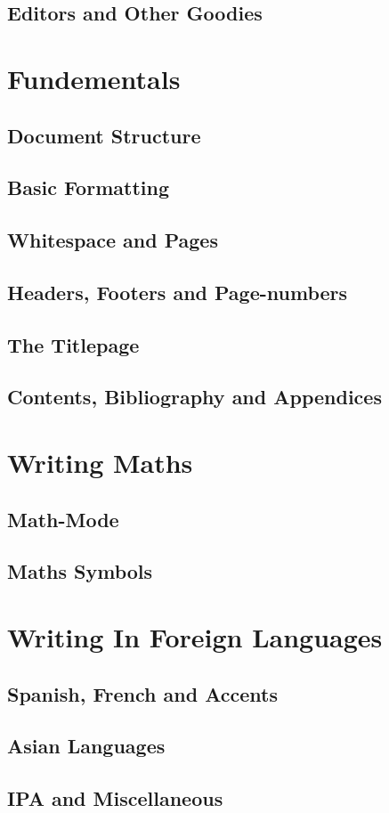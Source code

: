 \documentclass[12pt,a4paper]{article}
\begin{document}
\subsection{Editors and Other Goodies}

\newpage
\section{Fundementals}

\subsection{Document Structure}

\subsection{Basic Formatting}

\subsection{Whitespace and Pages}

\subsection{Headers, Footers and Page-numbers}

\subsection{The Titlepage}

\subsection{Contents, Bibliography and Appendices}

\newpage
\section{Writing Maths}

\subsection{Math-Mode}

\subsection{Maths Symbols}

\newpage
\section{Writing In Foreign Languages}

\subsection{Spanish, French and Accents}

\subsection{Asian Languages}

\subsection{IPA and Miscellaneous}




\end{document}
